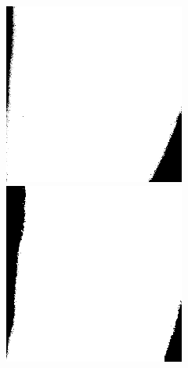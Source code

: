 \begin{figure}[H]
  \includegraphics[width=\linewidth]{imgs/x1.png}
\endminipage\hfill
{}
  \includegraphics[width=\linewidth]{imgs/x2.png}

\end{figure}

